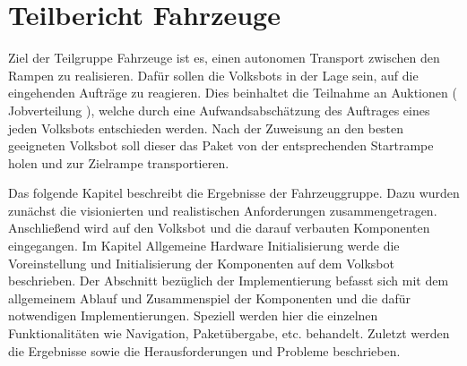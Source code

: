 \section{Teilbericht Fahrzeuge}

Ziel der Teilgruppe Fahrzeuge ist es, einen autonomen Transport zwischen den Rampen zu realisieren. Dafür sollen die Volksbots in der Lage sein, auf die eingehenden Aufträge zu reagieren.
Dies beinhaltet die Teilnahme an Auktionen ( Jobverteilung ), welche durch eine Aufwandsabschätzung des Auftrages eines jeden Volksbots entschieden werden. Nach der Zuweisung an den besten geeigneten Volksbot soll dieser das Paket von der entsprechenden Startrampe holen und zur Zielrampe transportieren.

Das folgende Kapitel beschreibt die Ergebnisse der Fahrzeuggruppe. Dazu wurden zunächst die visionierten und realistischen Anforderungen zusammengetragen. Anschließend wird auf den Volksbot und die darauf verbauten Komponenten eingegangen. Im Kapitel Allgemeine Hardware Initialisierung werde die Voreinstellung und Initialisierung der Komponenten auf dem Volksbot beschrieben. Der Abschnitt bezüglich der Implementierung befasst sich mit dem allgemeinem Ablauf und Zusammenspiel der Komponenten und die dafür notwendigen Implementierungen. Speziell werden hier die einzelnen Funktionalitäten wie Navigation, Paketübergabe, etc. behandelt. Zuletzt werden die Ergebnisse sowie die Herausforderungen und Probleme beschrieben.


































